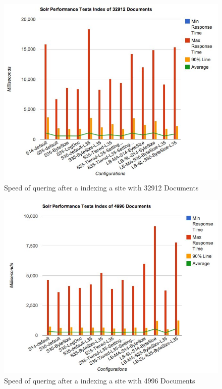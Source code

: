 \begin{figure}
     \includegraphics[width=\textwidth]{images/implementation/big-speed.jpg}
     \caption{Speed of quering after a indexing a site with 32912 Documents}
\end{figure}
\begin{figure}
     \includegraphics[width=\textwidth]{images/implementation/small-speed.jpg}
     \caption{Speed of quering after a indexing a site with 4996 Documents}
\end{figure}
